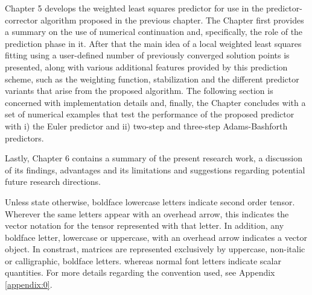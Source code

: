 Chapter 5 develops the weighted least squares predictor for use in the 
predictor-corrector algorithm proposed in the previous chapter. The Chapter first 
provides a summary on the use of numerical continuation and, specifically, the role of 
the prediction phase in it. After that the main idea of a local weighted least squares 
fitting using a user-defined number of previously converged solution points is 
presented, along with various additional features provided by this prediction scheme, 
such as the weighting function, stabilization and the different predictor variants 
that arise from the proposed algorithm. The following section is concerned with 
implementation details and, finally, the Chapter concludes with a set of numerical 
examples that test the performance of the proposed predictor with i) the Euler 
predictor and ii) two-step and three-step Adams-Bashforth predictors. 

Lastly, Chapter 6 contains a summary of the present research work, a discussion of its 
findings, advantages and its limitations and suggestions regarding potential future 
research directions.

 
Unless state otherwise, boldface lowercase letters indicate second order 
tensor. Wherever 
the same letters appear with an overhead arrow, this indicates the vector 
notation for the tensor represented with that letter.
In addition, any boldface letter, lowercase or uppercase, with an overhead 
arrow indicates a vector object. In constrast, matrices are represented 
exclusively by uppercase, non-italic or calligraphic, boldface letters.
whereas normal font letters indicate scalar quantities.  For more details 
regarding the convention used, see Appendix \ref{appendix:0}.





